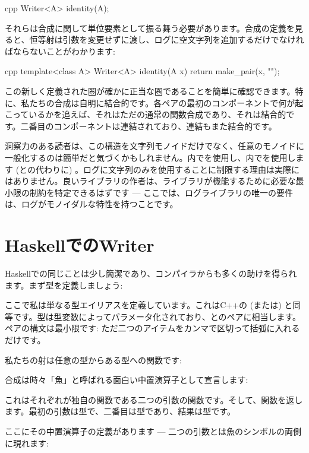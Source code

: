\begin{snip}{cpp}
Writer<A> identity(A);
\end{snip}
それらは合成に関して単位要素として振る舞う必要があります。合成の定義を見ると、恒等射は引数を変更せずに渡し、ログに空文字列を追加するだけでなければならないことがわかります:

\begin{snip}{cpp}
template<class A> Writer<A> identity(A x) {
    return make_pair(x, "");
}
\end{snip}
この新しく定義された圏が確かに正当な圏であることを簡単に確認できます。特に、私たちの合成は自明に結合的です。各ペアの最初のコンポーネントで何が起こっているかを追えば、それはただの通常の関数合成であり、それは結合的です。二番目のコンポーネントは連結されており、連結もまた結合的です。

洞察力のある読者は、この構造を文字列モノイドだけでなく、任意のモノイドに一般化するのは簡単だと気づくかもしれません。内でを使用し、内でを使用します (\code{+}との代わりに) 。ログに文字列のみを使用することに制限する理由は実際にはありません。良いライブラリの作者は、ライブラリが機能するために必要な最小限の制約を特定できるはずです --- ここでは、ログライブラリの唯一の要件は、ログがモノイダルな特性を持つことです。

\section{HaskellでのWriter}

Haskellでの同じことは少し簡潔であり、コンパイラからも多くの助けを得られます。まず型を定義しましょう:

ここで私は単なる型エイリアスを定義しています。これはC++の (または) と同等です。型は型変数によってパラメータ化されており、とのペアに相当します。ペアの構文は最小限です: ただ二つのアイテムをカンマで区切って括弧に入れるだけです。

私たちの射は任意の型からある型への関数です:

合成は時々「魚」と呼ばれる面白い中置演算子として宣言します:

これはそれぞれが独自の関数である二つの引数の関数です。そして、関数を返します。最初の引数は型で、二番目は型であり、結果は型です。

ここにその中置演算子の定義があります --- 二つの引数とは魚のシンボルの両側に現れます:


